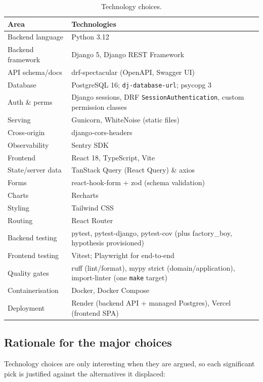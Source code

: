 \documentclass[11pt,a4paper]{article}
\begin{document}
\begin{table}[htbp]\centering
\small
\caption{Technology choices.}
\begin{tabular}{@{}p{}p{}@{}}
\toprule
\textbf{Area} & \textbf{Technologies} \\
\midrule
Backend language & Python 3.12 \\
Backend framework & Django 5, Django REST Framework \\
API schema/docs & drf-spectacular (OpenAPI, Swagger UI) \\
Database & PostgreSQL 16; \texttt{dj-database-url}; psycopg 3 \\
Auth \& perms & Django sessions, DRF \texttt{SessionAuthentication}, custom permission classes \\
Serving & Gunicorn, WhiteNoise (static files) \\
Cross-origin & django-cors-headers \\
Observability & Sentry SDK \\
Frontend & React 18, TypeScript, Vite \\
State/server data & TanStack Query (React Query) \& axios \\
Forms & react-hook-form + zod (schema validation) \\
Charts & Recharts \\
Styling & Tailwind CSS \\
Routing & React Router \\
Backend testing & pytest, pytest-django, pytest-cov (plus factory\_boy, hypothesis provisioned) \\
Frontend testing & Vitest; Playwright for end-to-end \\
Quality gates & ruff (lint/format), mypy strict (domain/application), import-linter (one \texttt{make} target) \\
Containerisation & Docker, Docker Compose \\
Deployment & Render (backend API + managed Postgres), Vercel (frontend SPA) \\
\bottomrule
\end{tabular}
\end{table}

\subsection{Rationale for the major choices}

Technology choices are only interesting when they are argued, so each significant pick is justified
against the alternatives it displaced:
\end{document}
